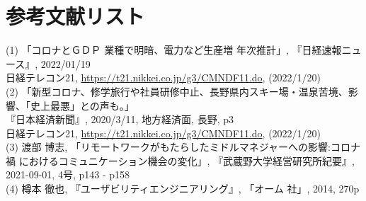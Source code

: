 \documentclass[dvipdfmx,autodetect-engine,titlepage]{jsarticle}
\begin{document}
\section{参考文献リスト}

(1) 「コロナとＧＤＰ 業種で明暗、電力など生産増 年次推計」, 『日経速報ニュース』, 2022/01/19\\
 \qquad\quad 日経テレコン21, \url{https://t21.nikkei.co.jp/g3/CMNDF11.do}, (2022/1/20)\\


(2) 「新型コロナ、修学旅行や社員研修中止、長野県内スキー場・温泉苦境、影響、「史上最悪」との声も。」\\
 \qquad\quad 『日本経済新聞』, 2020/3/11, 地方経済面, 長野, p3\\
 \qquad\quad 日経テレコン21, \url{https://t21.nikkei.co.jp/g3/CMNDF11.do}, (2022/1/20)\\

(3) 渡部 博志, 「リモートワークがもたらしたミドルマネジャーへの影響:コロナ禍
    におけるコミュニケーション機会の変化」, 『武蔵野大学経営研究所紀要』, 2021-09-01, 4号, p143 - p158\\

(4) 樽本 徹也, 『ユーザビリティエンジニアリング』, 「オーム 社」, 2014, 270p
\end{document}
